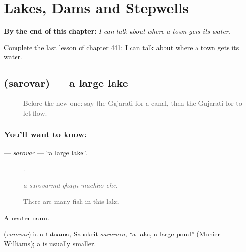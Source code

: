 
\chapter{Lakes, Dams and Stepwells}
\label{ch:gu-lakes-dams-and-stepwells}

\begin{chapteropening}
\textbf{By the end of this chapter:} \emph{I can talk about where a town gets its water.}

Complete the last lesson of chapter 441: I can talk about where a town gets its water.
\end{chapteropening}

\section[\texorpdfstring{\gu{સરોવર} (sarovar)}{સરોવર (sarovar)}]{ (sarovar) — a large lake}

\label{lesson:GU-C441-sarovar}



\begin{quote}
Before the new one: say the Gujarati for a canal, then the Gujarati for to let flow.
\end{quote}

\subsection*{You'll want to know: }
\textbf{} — \emph{sarovar} — \textquotedblleft{}a large lake\textquotedblright{}.

\begin{quote}
    .
\end{quote}

\begin{quote}
\emph{ā sarovarmā̃ ghaṇī māchlīo che.}
\end{quote}

\begin{quote}
There are many fish in this lake.
\end{quote}

A neuter noun.

\begin{cousinweb}
\textbf{} (\emph{sarovar}) is a tatsama, Sanskrit \emph{sarovara}, \textquotedblleft{}a lake, a large pond\textquotedblright{} (Monier-Williams); a  is usually smaller.
\end{cousinweb}


